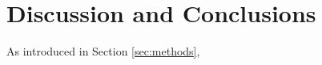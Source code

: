 \section{Discussion and Conclusions}
\label{sec:discu}


As introduced in Section \ref{sec:methods},
